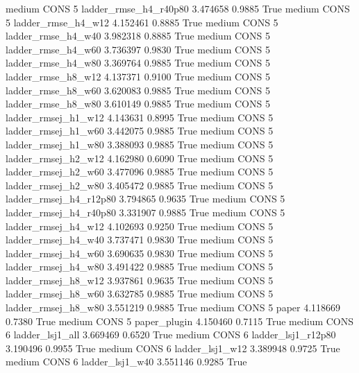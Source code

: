    medium     CONS                 5  ladder_rmse_h4_r40p80   3.474658      0.9885    True
    medium     CONS                 5     ladder_rmse_h4_w12   4.152461      0.8885    True
    medium     CONS                 5     ladder_rmse_h4_w40   3.982318      0.8885    True
    medium     CONS                 5     ladder_rmse_h4_w60   3.736397      0.9830    True
    medium     CONS                 5     ladder_rmse_h4_w80   3.369764      0.9885    True
    medium     CONS                 5     ladder_rmse_h8_w12   4.137371      0.9100    True
    medium     CONS                 5     ladder_rmse_h8_w60   3.620083      0.9885    True
    medium     CONS                 5     ladder_rmse_h8_w80   3.610149      0.9885    True
    medium     CONS                 5    ladder_rmsej_h1_w12   4.143631      0.8995    True
    medium     CONS                 5    ladder_rmsej_h1_w60   3.442075      0.9885    True
    medium     CONS                 5    ladder_rmsej_h1_w80   3.388093      0.9885    True
    medium     CONS                 5    ladder_rmsej_h2_w12   4.162980      0.6090    True
    medium     CONS                 5    ladder_rmsej_h2_w60   3.477096      0.9885    True
    medium     CONS                 5    ladder_rmsej_h2_w80   3.405472      0.9885    True
    medium     CONS                 5 ladder_rmsej_h4_r12p80   3.794865      0.9635    True
    medium     CONS                 5 ladder_rmsej_h4_r40p80   3.331907      0.9885    True
    medium     CONS                 5    ladder_rmsej_h4_w12   4.102693      0.9250    True
    medium     CONS                 5    ladder_rmsej_h4_w40   3.737471      0.9830    True
    medium     CONS                 5    ladder_rmsej_h4_w60   3.690635      0.9830    True
    medium     CONS                 5    ladder_rmsej_h4_w80   3.491422      0.9885    True
    medium     CONS                 5    ladder_rmsej_h8_w12   3.937861      0.9635    True
    medium     CONS                 5    ladder_rmsej_h8_w60   3.632785      0.9885    True
    medium     CONS                 5    ladder_rmsej_h8_w80   3.551219      0.9885    True
    medium     CONS                 5                  paper   4.118669      0.7380    True
    medium     CONS                 5           paper_plugin   4.150460      0.7115    True
    medium     CONS                 6        ladder_lsj1_all   3.669469      0.6520    True
    medium     CONS                 6     ladder_lsj1_r12p80   3.190496      0.9955    True
    medium     CONS                 6        ladder_lsj1_w12   3.389948      0.9725    True
    medium     CONS                 6        ladder_lsj1_w40   3.551146      0.9285    True
